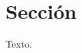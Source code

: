 \documentclass[11pt,letterpaper,DIV=12]{scrartcl}
\begin{document}


\section{Sección}

Texto.

\printbibliography
\end{document}
